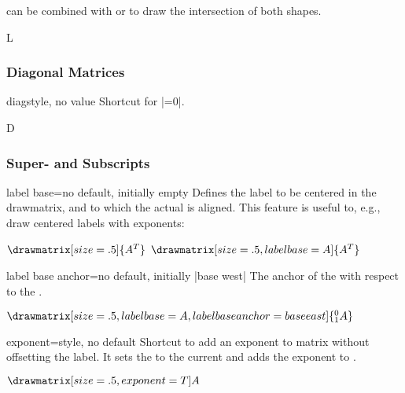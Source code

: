  can be combined with  or
 to draw the intersection of both shapes.
\begin{dispExample}
    L
\end{dispExample}


\subsubsection{Diagonal Matrices}

\begin{docDmKey}{diag}{}{style, no value}
    Shortcut for |=0|.
    \begin{dispExample}
        \drawmatrix[diag]D
    \end{dispExample}
\end{docDmKey}


\subsubsection{Super- and Subscripts}

\begin{docDmKey}{label base}{=}{no default, initially empty}
    Defines the label to be centered in the drawmatrix, and to which the actual
     is aligned.  This feature is useful to,
    e.g., draw centered labels with exponents:
    \begin{dispExample}
        $\drawmatrix[size=.5]{A^T}$
        $\drawmatrix[size=.5, label base=A]{A^T}$
    \end{dispExample}
\end{docDmKey}

\begin{docDmKey}{label base anchor}{=}{no default, initially |base west|}
    The anchor of the  with respect to the
    .
    \begin{dispExample}
        $\drawmatrix[size=.5, label base=A, label base anchor=base east]{^0_1A}$
    \end{dispExample}
\end{docDmKey}

\begin{docDmKey}{exponent}{=}{style, no default}
    Shortcut to add an exponent to matrix without offsetting the label.  It sets
    the  to the current  and adds the exponent  to .
    \begin{dispExample}
       $\drawmatrix[size=.5, exponent=T]A$
    \end{dispExample}
\end{docDmKey}


